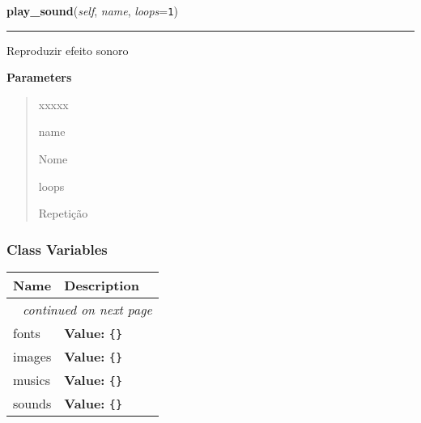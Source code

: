 \hspace{.8\funcindent}\begin{boxedminipage}{\funcwidth}

    \raggedright \textbf{play\_sound}(\textit{self}, \textit{name}, \textit{loops}={\tt 1})

    \vspace{-1.5ex}

    \rule{\textwidth}{0.5\fboxrule}
\setlength{\parskip}{2ex}
    Reproduzir efeito sonoro

\setlength{\parskip}{1ex}
      \textbf{Parameters}
      \vspace{-1ex}

      \begin{quote}
        \begin{Ventry}{xxxxx}

          \item[name]

          Nome

          \item[loops]

          Repetição

        \end{Ventry}

      \end{quote}

    \end{boxedminipage}



  \subsubsection{Class Variables}

    \vspace{-1cm}
\hspace{\varindent}\begin{longtable}{|p{\varnamewidth}|p{\vardescrwidth}|l}
\cline{1-2}
\cline{1-2} \centering \textbf{Name} & \centering \textbf{Description}& \\
\cline{1-2}
\endhead\cline{1-2}\multicolumn{3}{r}{\small\textit{continued on next page}}\\\endfoot\cline{1-2}
\endlastfoot\raggedright f\-o\-n\-t\-s\- & \raggedright \textbf{Value:} 
{\tt \texttt{\{}\texttt{\}}}&\\
\cline{1-2}
\raggedright i\-m\-a\-g\-e\-s\- & \raggedright \textbf{Value:} 
{\tt \texttt{\{}\texttt{\}}}&\\
\cline{1-2}
\raggedright m\-u\-s\-i\-c\-s\- & \raggedright \textbf{Value:} 
{\tt \texttt{\{}\texttt{\}}}&\\
\cline{1-2}
\raggedright s\-o\-u\-n\-d\-s\- & \raggedright \textbf{Value:} 
{\tt \texttt{\{}\texttt{\}}}&\\
\cline{1-2}
\end{longtable}

